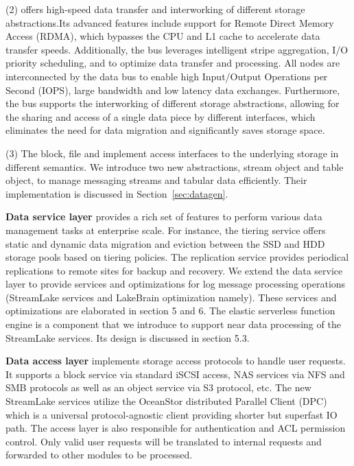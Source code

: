 (2)  offers high-speed data transfer and interworking of different storage abstractions.Its advanced features include support for Remote Direct Memory Access (RDMA), which bypasses the CPU and L1 cache to accelerate data transfer speeds. Additionally, the bus leverages intelligent stripe aggregation, I/O priority scheduling, and  to optimize data transfer and processing.
All nodes are interconnected by the data bus to enable high  Input/Output Operations per Second (IOPS), large bandwidth and low latency data exchanges. Furthermore, the bus supports the interworking of different storage abstractions, allowing for the sharing and  access of a single data piece by different interfaces, which eliminates the need for data migration and significantly saves storage space.

(3) The block, file and  implement access interfaces to the underlying storage in different semantics. We introduce two new abstractions, stream object and table object, to manage messaging streams and tabular data efficiently. Their implementation is discussed in Section~\ref{sec:datagen}.


\noindent \textbf{Data service layer} provides a rich set of features to perform various data management tasks at enterprise scale. For instance, the tiering service offers static and dynamic data migration and eviction between the SSD and HDD storage pools based on tiering policies. The replication service provides periodical replications to remote sites for backup and recovery. We extend the data service layer to provide services and optimizations for log message processing operations (StreamLake services and LakeBrain optimization namely). These services and optimizations are elaborated in section 5 and 6. The elastic serverless function engine is a component that we introduce to support near data processing of the StreamLake services. Its design is discussed in section 5.3. 


\noindent \textbf{Data access layer} implements storage access protocols to handle user requests. It supports a block service via standard iSCSI access, NAS services via NFS and SMB protocols as well as an object service via S3 protocol, etc. The new StreamLake services utilize the OceanStor distributed Parallel Client (DPC) which is a universal protocol-agnostic client providing shorter but superfast IO path. The access layer is also responsible for authentication and ACL permission control. Only valid user requests will be translated to internal requests and forwarded to other modules to be processed.
 